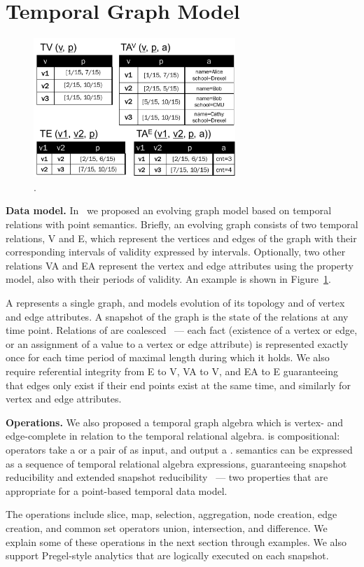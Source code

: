 \section{Temporal Graph Model}
\label{sec:tga}

\begin{figure}[t]
\centering
\includegraphics[width=3in]{figs/T1_rel.pdf}
\vspace{-0.2cm}
\caption{\tg {}.}
\vspace{-0.4cm}
\label{fig:tg_rel}
\end{figure}

{\bf Data model.}  In~\cite{PortalarXiv2016} we proposed an evolving
graph model \tg based on temporal relations with point semantics.
Briefly, an evolving graph consists of two temporal relations, V and
E, which represent the vertices and edges of the graph with their
corresponding intervals of validity expressed by intervals.
Optionally, two other relations VA and EA represent the vertex and
edge attributes using the property model, also with their periods of
validity.  An example is shown in Figure~\ref{fig:tg_rel}.

A \tg represents a single graph, and models evolution of its topology
and of vertex and edge attributes.  A snapshot of the graph is the
state of the relations at any time point.  Relations of \tg are
coalesced~\cite{DBLP:conf/vldb/BohlenSS96} --- each fact (existence of
a vertex or edge, or an assignment of a value to a vertex or edge
attribute) is represented exactly once for each time period of maximal
length during which it holds.  We also require referential integrity
from E to V, VA to V, and EA to E guaranteeing that edges only exist
if their end points exist at the same time, and similarly for vertex
and edge attributes.

{\bf Operations.}  We also proposed a temporal graph algebra \tga
which is vertex- and edge-complete in relation to the temporal
relational algebra.  \tga is compositional: operators take a \tg or a
pair of \tgs as input, and output a \tg.  \tga semantics can be
expressed as a sequence of temporal relational algebra expressions,
guaranteeing snapshot reducibility and extended snapshot
reducibility~\cite{DBLP:reference/db/Bohlen092} --- two properties
that are appropriate for a point-based temporal data model.

The \tga operations include slice, map, selection, aggregation, node
creation, edge creation, and common set operators union, intersection,
and difference.  We explain some of these operations in the next
section through examples.  We also support Pregel-style analytics that
are logically executed on each snapshot.


